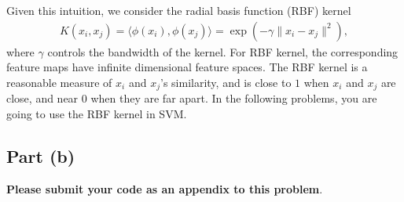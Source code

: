 \documentclass{article}
\theoremstyle{remark}
\theoremstyle{definition}
\begin{document}
\begin{enumerate}
Given this intuition, we consider the radial basis function (RBF) kernel
\begin{align}
	K(x_i, x_j) = \langle \phi(x_i), \phi(x_j)\rangle = \exp{\left(-\gamma \|x_i - x_j\|^2 \right)},
\end{align}
where $\gamma$ controls the bandwidth of the kernel. For RBF kernel, the corresponding feature maps have infinite dimensional feature spaces.
The RBF kernel is a reasonable measure of $x_i$ and $x_j$'s similarity, and is close to $1$ when $x_i$ and $x_j$ are close, and near $0$ when they are far apart.
In the following problems, you are going to use the RBF kernel in SVM.
\end{enumerate}

\subsection*{Part (b)}
        \textbf{Please submit your code as an appendix to this problem}.
\end{document}

